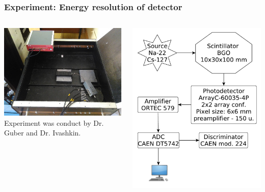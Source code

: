 \documentclass[11pt]{beamer}
\begin{document}
\begin{frame}
    \frametitle{Experiment: Energy resolution of detector}
    \begin{columns}
        \begin{column}{0.5\textwidth}
            
            \includegraphics[width=1\textwidth]{figures/setup1.png}\\
            Experiment was conduct by Dr. Guber and Dr. Ivashkin.
        \end{column}
                \begin{column}{0.5\textwidth}
            \includegraphics[width=1\textwidth]{figures/yed.pdf}
        \end{column}
    \end{columns}  
\end{frame}
\end{document}
